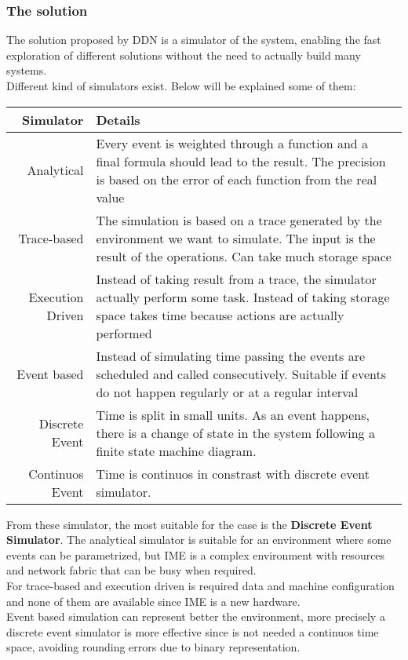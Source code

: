 \subsubsection*{The solution}
The solution proposed by DDN is a simulator of the system, enabling the fast
exploration of different solutions without the need to actually build many
systems. \\
Different kind of simulators exist. Below will be explained some of them:

\vspace{0.5cm}
\begin{tabular}{r | p{}}
    \textbf{Simulator} & \textbf{Details} \\ \hline
    Analytical & 
    Every event is weighted through a function and a final formula
    should lead to the result. The precision is based on the error of each
    function from the real value \\ \hline

    Trace-based &
    The simulation is based on a trace generated by the environment we
    want to simulate. The input is the result of the operations. Can take much
    storage space\\\hline

    Execution Driven &
    Instead of taking result from a trace, the simulator
    actually perform some task. Instead of taking storage space takes time
    because actions are actually performed\\\hline

    Event based & 
    Instead of simulating time passing the events are scheduled
    and called consecutively. Suitable if events do not happen regularly or at a
    regular interval\\\hline
    
    Discrete Event & 
    Time is split in small units. As an event happens, there is
    a change of state in the system following a finite state machine
    diagram.\\\hline

    Continuos Event & 
    Time is continuos in constrast with discrete event simulator.
\end{tabular}
\vspace{0.5cm}

From these simulator, the most suitable for the case is the \textbf{Discrete
Event Simulator}. The analytical simulator is suitable for an environment where
some events can be parametrized, but IME is a complex environment with resources
and network fabric that can be busy when required. \\
For trace-based and execution driven is required data and machine configuration
and none of them are available since IME is a new hardware. \\
Event based simulation can represent better the environment, more precisely a
discrete event simulator is more effective since is not needed a continuos time
space, avoiding rounding errors due to binary representation.

